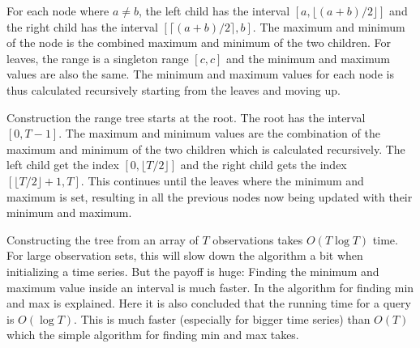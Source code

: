 For each node where $a \neq b$, the left child has the interval $[a, \lfloor
(a+b)/2 \rfloor]$ and the right child has the interval $[\lceil
(a+b)/2 \rceil, b]$. The maximum and minimum of the node is the combined maximum
and minimum of the two children. For leaves, the range is a singleton range
$[c,c]$ and the minimum and maximum values are also the same. The minimum and
maximum values for each node is thus calculated recursively starting from the
leaves and moving up. 

Construction the range tree starts at the root. The root has the interval
$[0,T-1]$. The maximum and minimum values are the combination of the maximum and
minimum of the two children which is calculated recursively. The left child get
the index $[0, \lfloor T/2 \rfloor]$ and the right child gets the index $[\lfloor
T/2 \rfloor + 1, T ]$. This
continues until the leaves where the minimum and maximum is set, resulting in
all the previous nodes now being updated with their minimum and maximum. 

Constructing the tree from an array of $T$ observations takes 
$O(T \log T)$ time. For large observation sets, this will slow down the
algorithm a bit when initializing a time series. But the payoff is huge: Finding
the minimum and maximum value inside an interval is much faster. In
\cite{compstat14} the algorithm for finding min and max is explained. Here it is
also concluded that the running time for a query is $O(\log T)$. This is much
faster (especially for bigger time series) than $O(T)$ which the simple
algorithm for finding min and max takes. 
